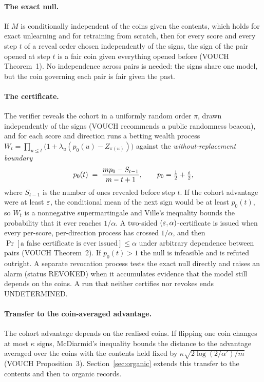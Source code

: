 \paragraph{The exact null.} If $M$ is conditionally independent of the coins given the
contents, which holds for exact unlearning and for retraining from scratch, then for
every score and every step $t$ of a reveal order chosen independently of the signs, the
sign of the pair opened at step $t$ is a fair coin given everything opened before
(VOUCH Theorem~1). No independence across pairs is needed: the signs share one model,
but the coin governing each pair is fair given the past.

\paragraph{The certificate.} The verifier reveals the cohort in a uniformly random order
$\pi$, drawn independently of the signs (VOUCH recommends a public randomness beacon), and
for each score and direction runs a betting wealth process
$W_t=\prod_{u\le t}\bigl(1+\lambda_u(p_0(u)-Z_{\pi(u)})\bigr)$ against the
\emph{without-replacement boundary}
\begin{equation}\label{eq:worboundary}
p_0(t) \;=\; \frac{m p_0 - S_{t-1}}{m-t+1},\qquad p_0=\tfrac12+\tfrac{\varepsilon}2,
\end{equation}
where $S_{t-1}$ is the number of ones revealed before step $t$. If the cohort
advantage were at least $\varepsilon$, the conditional mean of the next sign would be at least
$p_0(t)$, so $W_t$ is a nonnegative supermartingale and Ville's inequality bounds the
probability that it ever reaches $1/\alpha$. A two-sided $(\varepsilon,\alpha)$-certificate is
issued when every per-score, per-direction process has crossed $1/\alpha$, and then
$\Pr[\text{a false certificate is ever issued}]\le\alpha$ under arbitrary dependence
between pairs (VOUCH Theorem~2). If $p_0(t)>1$ the null is infeasible and is refuted
outright. A separate revocation process tests the exact null directly and raises an
alarm (status REVOKED) when it accumulates evidence that the model still depends on the
coins. A run that neither certifies nor revokes ends UNDETERMINED.

\paragraph{Transfer to the coin-averaged advantage.} The cohort advantage depends on the
realised coins. If flipping one coin changes at most $\kappa$ signs, McDiarmid's
inequality \citep{mcdiarmid1989bounded} bounds the distance to the advantage averaged
over the coins with the contents held fixed by $\kappa\sqrt{2\log(2/\alpha')/m}$ (VOUCH
Proposition~3). Section~\ref{sec:organic} extends this transfer to the contents and then
to organic records.

